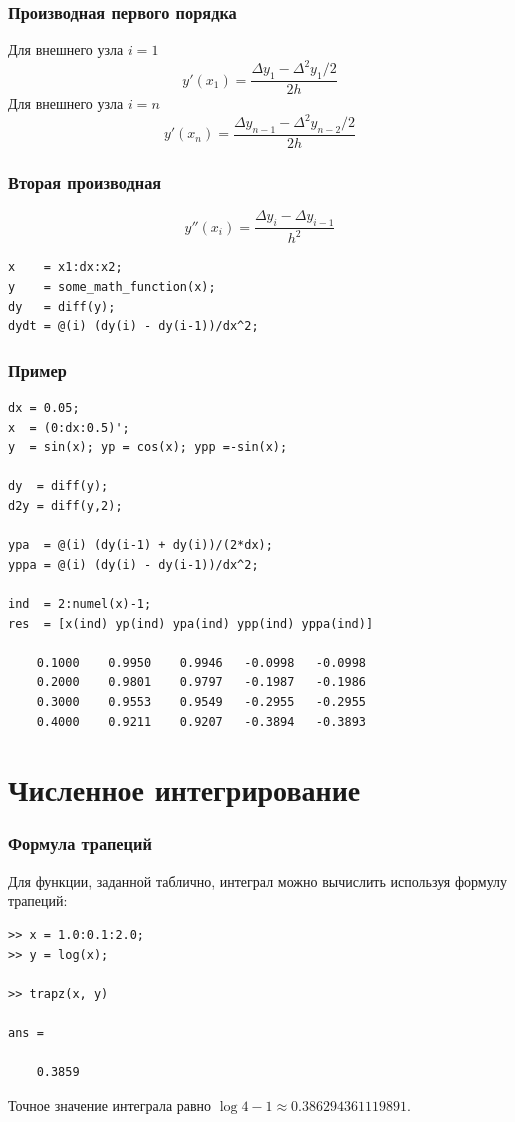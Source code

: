 \documentclass[11pt, compress]{beamer}
\begin{document}
\begin{frame}[c]
\frametitle{Производная первого порядка}
Для внешнего узла $i=1$
$$
    y'(x_1) = \frac{\Delta y_{1} - \Delta^2 y_{1}/2}{2h}
$$
Для внешнего узла $i=n$
$$
    y'(x_n) = \frac{\Delta y_{n-1} - \Delta^2 y_{n-2}/2}{2h}
$$
\end{frame}

\begin{frame}[c,fragile]
\frametitle{Вторая производная}
$$
  y''(x_i) = \frac{\Delta y_i - \Delta y_{i-1}}{h^2}  
$$
\begin{lstlisting}
x    = x1:dx:x2;    
y    = some_math_function(x);
dy   = diff(y);        
dydt = @(i) (dy(i) - dy(i-1))/dx^2;
\end{lstlisting}
\end{frame}

\begin{frame}[t,fragile]\frametitle{Пример}
\small
\begin{lstlisting}
dx = 0.05;      
x  = (0:dx:0.5)';
y  = sin(x); yp = cos(x); ypp =-sin(x);

dy  = diff(y);
d2y = diff(y,2);

ypa  = @(i) (dy(i-1) + dy(i))/(2*dx);
yppa = @(i) (dy(i) - dy(i-1))/dx^2;

ind  = 2:numel(x)-1;
res  = [x(ind) yp(ind) ypa(ind) ypp(ind) yppa(ind)]

    0.1000    0.9950    0.9946   -0.0998   -0.0998
    0.2000    0.9801    0.9797   -0.1987   -0.1986
    0.3000    0.9553    0.9549   -0.2955   -0.2955
    0.4000    0.9211    0.9207   -0.3894   -0.3893
\end{lstlisting}
\end{frame}

\section{Численное интегрирование}

\begin{frame}[fragile]
\frametitle{Формула трапеций}
Для функции, заданной таблично, интеграл можно вычислить используя формулу трапеций: 
\begin{lstlisting}
>> x = 1.0:0.1:2.0;
>> y = log(x);

>> trapz(x, y)

ans =

    0.3859
\end{lstlisting}    
Точное значение интеграла равно $\log 4 - 1 \approx 0.386294361119891$.
\end{frame}
\end{document}
